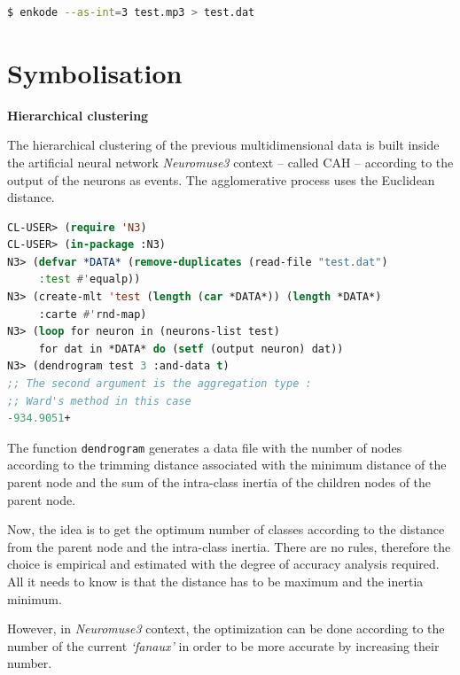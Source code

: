 \smallskip

\begin{lstlisting}[language=bash]
$ enkode --as-int=3 test.mp3 > test.dat
\end{lstlisting}

\section{Symbolisation}
\label{sym}

\textbf{Hierarchical clustering}
\smallskip

The hierarchical clustering of the previous multidimensional data is built inside the artificial neural network \textsl{Neuromuse3} context -- called CAH -- according to the output of the neurons as events. The agglomerative process uses the Euclidean distance.

\smallskip

\begin{lstlisting}[language=Lisp]
CL-USER> (require 'N3)
CL-USER> (in-package :N3)
N3> (defvar *DATA* (remove-duplicates (read-file "test.dat") 
     :test #'equalp))
N3> (create-mlt 'test (length (car *DATA*)) (length *DATA*) 
     :carte #'rnd-map)
N3> (loop for neuron in (neurons-list test) 
     for dat in *DATA* do (setf (output neuron) dat))
N3> (dendrogram test 3 :and-data t)
;; The second argument is the aggregation type :
;; Ward's method in this case
-934.9051+
\end{lstlisting}

\smallskip

The function \texttt{dendrogram} generates a data file with the number of nodes according to the trimming distance associated with the minimum distance of the parent node and the sum of the intra-class inertia of the children nodes of the parent node.

Now, the idea is to get the optimum number of classes according to the distance from the parent node and the intra-class inertia. There are no rules, therefore the choice is empirical and estimated with the degree of accuracy analysis required. All it needs to know is that the distance has to be maximum and the inertia minimum.

However, in \textsl{Neuromuse3} context, the optimization can be done according to the number of the current \textit{`fanaux'} in order to be more accurate by increasing their number.

